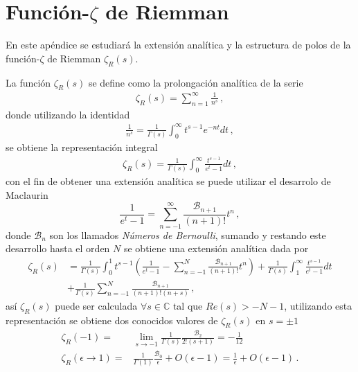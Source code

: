 \chapter{Función-\texorpdfstring{$\zeta$}{}  de Riemman} \label{Apendice.2}

En este apéndice se estudiará la extensión analítica y la estructura de polos de la función-$\zeta$ de Riemman $\zeta _R (s)$.

La función $\zeta _R (s)$ se define como la prolongación analítica de la serie
\begin{align}
	\zeta _R (s) = 
	\sum _{n=1} ^{\infty} \frac{1}{n ^{s}}
	\, ,
\end{align}
donde utilizando la identidad
\begin{align}
	\frac{1}{n ^{s}} =
	\frac{1}{\Gamma (s)} 
	\int _0 ^{\infty} t^{s-1} e ^{-n t}  dt
	\, ,
\end{align}
se obtiene la representación integral
\begin{align}
	\zeta _R (s) = 
	\frac{1}{\Gamma (s)}
	\int _0 ^\infty
	\frac{t ^{s-1}}{e ^t -1} dt
	\, ,
\end{align}
con el fin de obtener una extensión analítica se puede utilizar el desarrolo de Maclaurin
\begin{equation}
	\frac{1}{e ^t -1} = 
	\sum _{n=-1} ^{\infty}
	\frac{ \mathcal{B} _{n+1}}{(n+1)!} t ^n
	\, ,
\label{eq.ap.des}
\end{equation}
donde $\mathcal{B} _{n}$ son los llamados {\it Números de Bernoulli}, sumando y restando este desarrollo hasta el orden $N$ se obtiene una extensión analítica dada por
\begin{align}
\nonumber
	\zeta _R (s) &= 
	\frac{1}{\Gamma (s)}
	\int _0 ^1 
	t ^{s-1} 
	\left(	
		\frac{1}{e ^t -1} -
		\sum _{n=-1} ^{N}
		\frac{ \mathcal{B} _{n+1}}{(n+1)!} t ^n	
		\right)		
		+
	\frac{1}{\Gamma (s)}
	\int _1 ^\infty
	\frac{t ^{s-1}}{e ^t -1} dt
\\
	&+
	\frac{1}{\Gamma (s)}
	\sum _{n=-1} ^{N}
	\frac{ \mathcal{B} _{n+1}}{ (n+1)! (n + s)}
	\, ,
\end{align}
así $\zeta _R (s)$ puede ser calculada $\forall s \in \mathds{C}$ tal que $Re (s) > -N-1$, utilizando esta representación se obtiene dos conocidos valores de $\zeta _R (s)$ en $s = \pm 1$
\begin{align}
	\zeta _R (-1) = 
&
	\lim _{s \rightarrow -1}
			\frac{1}{\Gamma (s)} \frac{\mathcal{B} _2}{2! (s+1)}
			 =
	- \frac{1}{12}
\\
	\zeta _R (\epsilon \rightarrow 1) =
& 
	\frac{1}{\Gamma (1)} \frac{\mathcal{B} _0}{ \epsilon} + O (\epsilon -1 ) = 
	\frac{1}{ \epsilon} + O (\epsilon -1 ) 
	\, .
\end{align}
